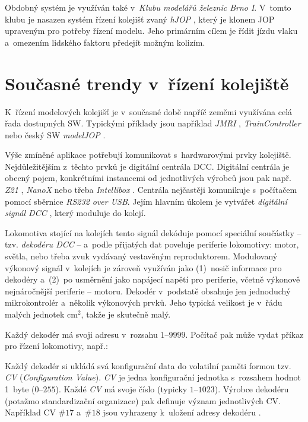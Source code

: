 Obdobný systém je využíván také v~\textit{Klubu modelářů železnic Brno I}.
V~tomto klubu je nasazen systém řízení kolejišť zvaný \textit{hJOP}
\cite{hjop:web}, který je klonem \gls{JOP} upraveným pro potřeby řízení modelu. Jeho
primárním cílem je řídit jízdu vlaku a~omezením lidského faktoru předejít
možným kolizím.

\section{Současné trendy v~řízení kolejiště}
\label{sec:trendy}

K~řízení modelových kolejišť je v~současné době napříč zeměmi využívána celá
řada dostupných SW. Typickými příklady jsou například \textit{JMRI}
\cite{jmri:web}, \textit{TrainController} \cite{traincontroller:web}
nebo český SW \textit{modelJOP} \cite{modeljop:web}.

Výše zmíněné aplikace potřebují komunikovat s~hardwarovými prvky kolejiště.
Nejdůležitějším z~těchto prvků je digitální centrála \gls{DCC}. Digitální centrála je
obecný pojem, konkrétními instancemi od jednotlivých výrobců jsou pak např.
\textit{Z21} \cite{z21:web}, \textit{NanoX} \cite{nanox:web} nebo třeba
\textit{Intellibox} \cite{intellibox:web}. Centrála nejčastěji komunikuje
s~počítačem pomocí sběrnice \textit{RS232 over USB}. Jejím hlavním úkolem je
vytvářet \textit{digitální signál \gls{DCC}} \cite{nmra:dcc:ele}, který moduluje do
kolejí.

Lokomotiva stojící na kolejích tento signál dekóduje pomocí spe\-ciál\-ní
součástky -- tzv. \textit{dekodéru \gls{DCC}} -- a~podle přijatých dat poveluje
periferie lokomotivy: motor, světla, nebo třeba zvuk vydávaný vestavěným
reproduktorem. Modulovaný výkonový signál v~kolejích je zároveň využíván jako
(1)~nosič informace pro dekodéry a~(2)~po usměrnění jako napájecí napětí pro
periferie, včetně výkonově nejnáročnější periferie -- motoru. Dekodér
v~podstatě obsahuje jen jednoduchý mikrokontrolér a~několik výkonových prvků.
Jeho typická velikost je v~řádu malých jednotek cm$^2$, takže je skutečně malý.

Každý dekodér má svoji adresu v~rozsahu $1$--$9999$. Počítač pak může vydat příkaz
pro řízení lokomotivy, např.: \textit{}

Každý dekodér si ukládá svá konfigurační data do volatilní paměti formou tzv.
\textit{\gls{CV}} (\textit{Configuration Value}). \textit{\gls{CV}} je jedna konfigurační
jednotka s~rozsahem hodnot 1~byte ($0$--$255$). Každé \textit{\gls{CV}} má svoje číslo
(typicky $1$--$1023$). Výrobce dekodéru (potažmo standardizační organizace) pak
definuje význam jednotlivých \gls{CV}. Například \gls{CV} $\#17$ a~$\#18$ jsou vyhrazeny
k~uložení adresy dekodéru \cite{zimo:cvs}.

